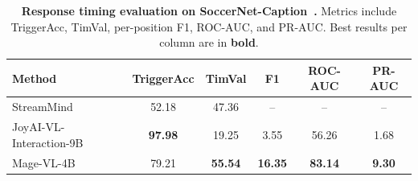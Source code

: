 \begin{table}[t]
\centering
\small
\setlength{\tabcolsep}{6pt}
\caption{\textbf{Response timing evaluation on SoccerNet-Caption~\cite{mkhallati2023soccernet}.} Metrics include TriggerAcc, TimVal, per-position F1, ROC-AUC, and PR-AUC. Best results per column are in \textbf{bold}.}
\label{tab:response_timing}
\begin{tabular}{l c c c c c}
\toprule
Method & TriggerAcc & TimVal & F1 & ROC-AUC & PR-AUC \\
\midrule
StreamMind~\cite{ding2025streammindunlockingframerate} & 52.18 & 47.36 & -- & -- & -- \\
JoyAI-VL-Interaction-9B~\cite{joyai2026vlinteraction}     & \textbf{97.98} & 19.25 & 3.55 & 56.26 & 1.68 \\
Mage-VL-4B                                      & 79.21 & \textbf{55.54} & \textbf{16.35} & \textbf{83.14} & \textbf{9.30} \\
\bottomrule
\end{tabular}
\end{table}
